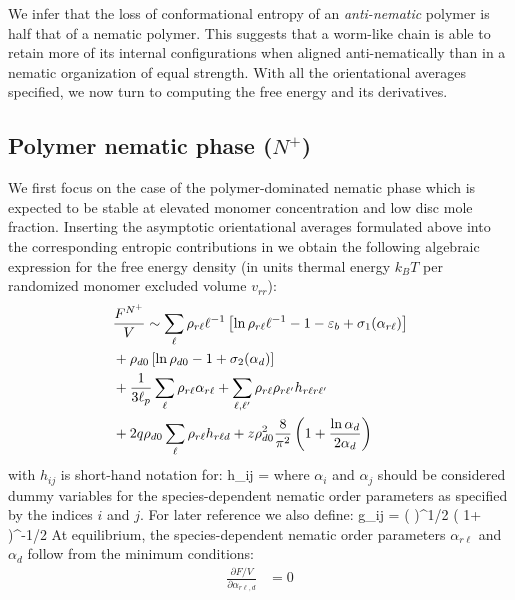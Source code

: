 We infer that the loss of conformational entropy of an {\em anti-nematic} polymer is half that of a nematic polymer. This suggests that a worm-like chain is able to retain more of its internal configurations when aligned anti-nematically than in a nematic organization of equal strength. With all the orientational averages specified, we  now turn to computing the free energy and its derivatives. 



\subsection{Polymer nematic phase ($N^{+}$)}

We first focus on the case of the polymer-dominated nematic phase which is expected to be stable at elevated monomer concentration and low disc mole fraction.  Inserting the asymptotic orientational averages formulated above into the corresponding entropic contributions in  we obtain the following algebraic expression for the free energy density (in units thermal energy $k_{B}T$ per randomized monomer excluded volume $v_{rr}$):
\begin{align}
   & \frac{F^{N^{+}}}{V}  \sim  \sum_{\ell }  \rho_{r \ell} \ell^{-1}  \left [ \ln \rho_{r \ell} \ell^{-1}  -1 - \varepsilon_{b}  + \sigma_{1}(\alpha_{r \ell}) \right ] \nonumber \\
   & + \rho_{d0} \left [ \ln \rho_{d0} -1 + \sigma_{2}(\alpha_{d}) \right ]  \nonumber \\ 
    & + \frac{1}{3\ell_{p}} \sum_{\ell } \rho_{r \ell} \alpha_{r \ell} + \sum_{\ell,\ell^{\prime}} \rho_{r \ell} \rho_{r \ell^{\prime}} h_{r\ell r\ell^{\prime}} \nonumber \\
    & + 2 q \rho_{d0} \sum_{\ell} \rho_{r \ell} h_{r\ell d} + z \rho_{d0}^{2} \frac{8}{\pi^{2}} \left ( 1+ \frac{\ln \alpha_{d}}{2 \alpha_{d}}   \right ) 
\end{align}
with $h_{ij}$ is short-hand notation for:
\beq
h_{ij} =  
\eeq
where $\alpha_{i}$ and $\alpha_{j}$ should be considered dummy variables for the species-dependent nematic order parameters as specified by the indices $i$ and $j$. 
For later reference we also define:
\beq
g_{ij} = \left (   \right)^{1/2}  \left ( 1+  \right )^{-1/2}
\eeq
At equilibrium, the species-dependent nematic order parameters $\alpha_{r\ell}$ and $\alpha_{d}$ follow from the minimum conditions:
\begin{align}
    \frac{\partial F/V}{\partial \alpha_{r \ell,d}} &=0 
    \label{dalpha}
\end{align}
